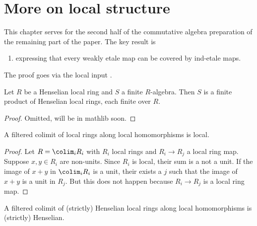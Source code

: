 \chapter{More on local structure}

This chapter serves for the second half of the commutative algebra preparation of the remaining part of the paper. The key result is
\begin{enumerate}
  \item {} expressing that every weakly etale map can be covered by ind-etale maps.
\end{enumerate}
The proof goes via the local input \label{weakly-etale-over-sh}.

\begin{lemma}
    Let $R$ be a Henselian local ring and $S$ a finite $R$-algebra. Then $S$ is
    a finite product of Henselian local rings, each finite over $R$.
    \label{lemma:finite-over-henselian-local}
    \leanok
\end{lemma}

\begin{proof}
    Omitted, will be in mathlib soon.
\end{proof}

\begin{lemma}
    A filtered colimit of local rings along local homomorphisms is local.
    \label{lemma:colimit-local}
    \leanok
\end{lemma}

\begin{proof}
    \leanok
    Let $R = \colim_i R_i$ with $R_i$ local rings and $R_i \to R_j$ a local ring map.
    Suppose $x, y \in R_i$ are non-units. Since $R_i$ is local, their sum is a not a unit.
    If the image of $x + y$ in $\colim_i R_i$ is a unit, their exists a $j$ such that the image of $x + y$ is a
    unit in $R_j$. But this does not happen because $R_i \to R_j$ is a local ring map.
\end{proof}

\begin{lemma}
    A filtered colimit of (strictly) Henselian local rings along local homomorphisms is
    (strictly) Henselian.
    \label{lemma:colimit-henselian-local}
\end{lemma}

